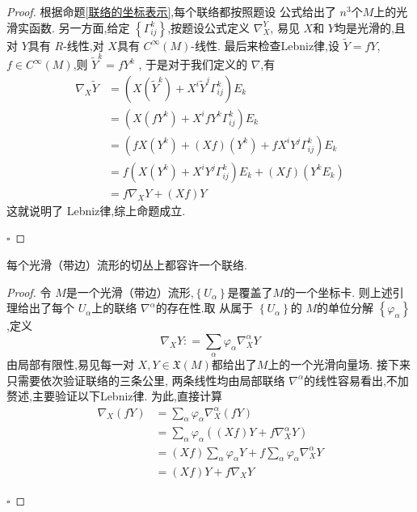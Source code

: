 \documentclass[../../几何与拓扑.tex]{subfiles}
\begin{document}
\begin{proof}
    根据命题\ref{联络的坐标表示},每个联络都按照题设
    公式给出了 \(  n^{3}  \)个\( M  \)上的光滑实函数.  
    另一方面,给定 \(  \left\{  \Gamma _{ij}^{k} \right\}  \),按题设公式定义 \(   \nabla _{X}^{Y}  \), 
    易见 \(  X  \)和 \(  Y  \)均是光滑的,且对 \(  Y  \)具有 \(  R  \)-线性,对 \(  X  \)具有 \(  C^{\infty}\left( M \right)   \)-线性.       
    最后来检查Lebniz律,设 \(  \tilde{Y}=  fY  \), \(  f \in C^{\infty}\left( M \right)   \),则 \(  \tilde{Y}^{k}= f Y^{k}  \)   ,
    于是对于我们定义的 \(   \nabla   \),有 \[
     \begin{aligned}
        \nabla _{X}\tilde{Y}&=  \left( X\left( \tilde{Y}^{k} \right) + X^{i}\tilde{Y}^{j} \Gamma _{ij}^{k}  \right)E_{k}  \\ 
        & =   \left( X\left( fY^{k} \right)+  X^{i}fY^{k}  \Gamma _{ij}^{k}  \right)E_{k}\\ 
         & =  \left( fX\left( Y^{k} \right)+ \left( Xf \right)\left( Y^{k} \right)+  f X^{i}Y^{j} \Gamma _{ij}^{k}    \right)E_{k}\\ 
          & =  f\left( X\left( Y^{k} \right)+ X^{i}Y^{j} \Gamma _{ij}^{k}  \right)E_{k}+  \left( Xf \right)\left( Y^{k}E_{k} \right)     \\ 
           & =  f \nabla _{X}Y+  \left( Xf \right)Y 
     \end{aligned}
    \] 这就说明了 Lebniz律,综上命题成立.

    \hfill $\square$
\end{proof}

\begin{proposition}
    每个光滑（带边）流形的切丛上都容许一个联络.
\end{proposition}

\begin{proof}
    令 \(  M  \)是一个光滑（带边）流形,\(  \left\{ U_{\alpha } \right\}  \)是覆盖了\(  M  \)的一个坐标卡.
    则上述引理给出了每个 \(  U_{\alpha }  \)上的联络 \(   \nabla ^{\alpha }  \)的存在性.取 从属于 \(  \left\{ U_{\alpha } \right\}  \)的 \(  M  \)的单位分解 \(  \left\{  \varphi _{\alpha } \right\}  \)        ,定义 \[
     \nabla _{X}Y: =  \sum _{\alpha } \varphi _{\alpha } \nabla _{X}^{\alpha }Y
    \]由局部有限性,易见每一对 \(  X,Y \in \mathfrak{X}\left( M \right)   \)都给出了\(  M  \)上的一个光滑向量场.
    接下来只需要依次验证联络的三条公里, 两条线性均由局部联络 \(   \nabla ^{\alpha }  \)的线性容易看出,不加赘述,主要验证以下Lebniz律.
    为此,直接计算 \[
    \begin{aligned}
     \nabla _{X}\left( fY \right)& =  \sum _{ \alpha }  \varphi _{\alpha }\nabla _{X}^{\alpha }\left( fY \right)\\ 
      & =  \sum _{\alpha } \varphi _{\alpha }\left( \left( Xf \right)Y+ f \nabla _{X}^{\alpha }Y  \right)    \\ 
       & =  \left( Xf \right)\sum _{\alpha } \varphi _{\alpha }Y+  f\sum _{\alpha } \varphi _{\alpha } \nabla _{X}^{\alpha }Y\\ 
        & =  \left( Xf \right)Y+  f \nabla _{X}Y  
    \end{aligned}
    \]   

    \hfill $\square$
\end{proof}
\end{document}
